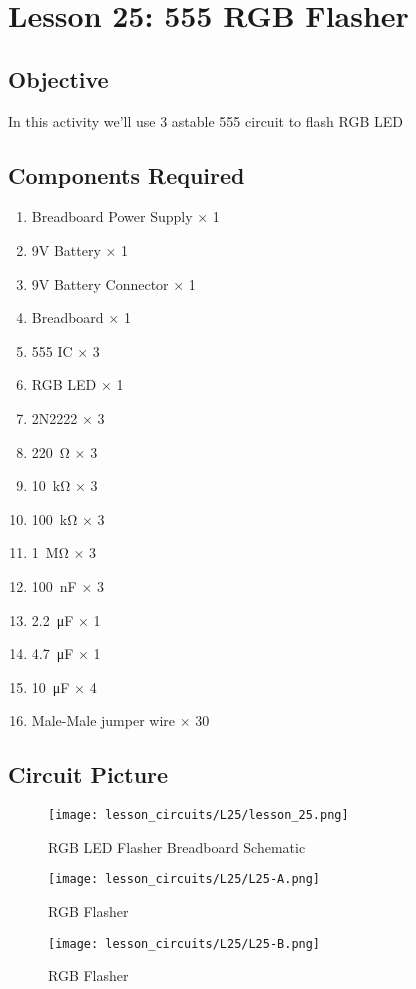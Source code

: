 \section{Lesson 25: 555 RGB Flasher}
\subsection{Objective}
In this activity we'll use 3 astable 555 circuit to flash RGB LED
\subsection{Components Required}
\begin{enumerate}
    \item Breadboard Power Supply $\times$ 1
    \item 9V Battery $\times$ 1
    \item 9V Battery Connector $\times$ 1
    \item Breadboard $\times$ 1
    \item 555 IC $\times$ 3
    \item RGB LED $\times$ 1
    \item 2N2222 $\times$ 3
    \item \SI{220}{\ohm} $\times$ 3
    \item \SI{10}{\kilo\ohm} $\times$ 3
    \item \SI{100}{\kilo\ohm} $\times$ 3
    \item \SI{1}{\Mohm} $\times$ 3
    \item \SI{100}{\nano\farad} $\times$ 3
    \item \SI{2.2}{\micro\farad} $\times$ 1
    \item \SI{4.7}{\micro\farad} $\times$ 1
    \item \SI{10}{\micro\farad} $\times$ 4
    \item Male-Male jumper wire $\times$ 30
\end{enumerate}
\subsection{Circuit Picture}
\begin{figure}[!hp]
    \centering
    \texttt{[image: lesson\_circuits/L25/lesson\_25.png]}
    \caption{RGB LED Flasher Breadboard Schematic}
    \label{fig:555_rgb_sch}
\end{figure}
\begin{figure}[!hp]
    \centering
    \texttt{[image: lesson\_circuits/L25/L25-A.png]}
    \caption{RGB Flasher}
    \label{fig:555_rgb_obb}
\end{figure}
\begin{figure}[!hp]
    \centering
    \texttt{[image: lesson\_circuits/L25/L25-B.png]}
    \caption{RGB Flasher}
    \label{fig:555_rgb_obb1}
\end{figure}